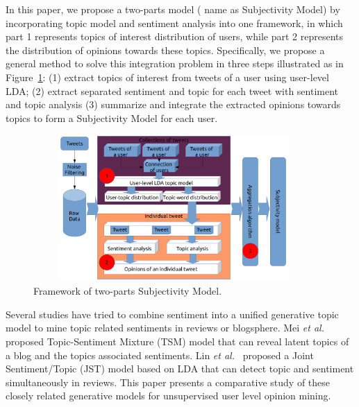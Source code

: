 \documentclass[runningheads,a4paper]{llncs}
\begin{document}
In this paper, we propose a two-parts model ( name as Subjectivity Model) by incorporating topic model and sentiment analysis into one framework, in which part 1 represents topics of interest distribution of users, while part 2 represents the distribution of opinions towards these topics. Specifically, we propose a general method to solve this integration problem in three steps illustrated as in Figure~\ref{fig1}: (1) extract topics of interest from tweets of a user using user-level LDA; (2) extract separated sentiment and topic for each tweet with sentiment and topic analysis  (3) summarize and integrate the extracted opinions towards topics to form a Subjectivity Model for each user.
\begin{figure}[htb]
\centering
\includegraphics[width=4.2in,height=2.2in]{procedure.pdf}
\caption{Framework of two-parts Subjectivity Model.}
\label{fig1}
\end{figure}

Several studies have tried to combine sentiment into a unified generative topic model to mine topic related sentiments in reviews or blogsphere. Mei \emph{et al.}~\cite{mei2007topic} proposed Topic-Sentiment Mixture (TSM) model that can reveal latent topics of a blog and the topics associated sentiments. Lin \emph{et al.}~\cite{lin2009joint} proposed a Joint Sentiment/Topic (JST) model based on LDA that can detect topic and sentiment simultaneously in reviews. This paper presents a comparative study of these closely related generative models for unsupervised user level opinion mining.
\end{document}
